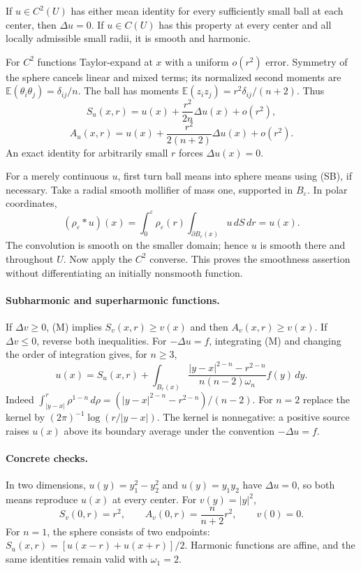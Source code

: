 \begin{theorem}
If $u\in C^2(U)$ has either mean identity for every sufficiently small
ball at each center, then $\Delta u=0$.
If $u\in C(U)$ has this property at every center and all locally admissible
small radii, it is smooth and harmonic.
\end{theorem}
\begin{expandedproof}
For $C^2$ functions Taylor-expand at $x$ with a uniform $o(r^2)$ error.
Symmetry of the sphere cancels linear and mixed terms; its normalized
second moments are
$\mathbb E(\theta_i\theta_j)=\delta_{ij}/n$.
The ball has moments $\mathbb E(z_i z_j)=r^2\delta_{ij}/(n+2)$.
Thus
\[
 S_u(x,r)=u(x)+\frac{r^2}{2n}\Delta u(x)+o(r^2),
\]
\[
 A_u(x,r)=u(x)+\frac{r^2}{2(n+2)}\Delta u(x)+o(r^2).
 \tag{T}
\]
An exact identity for arbitrarily small $r$ forces $\Delta u(x)=0$.

For a merely continuous $u$, first turn ball means into sphere means
using (SB), if necessary. Take a radial smooth mollifier of mass one,
supported in $B_\varepsilon$. In polar coordinates,
\[
 (\rho_\varepsilon*u)(x)
 =\int_0^\varepsilon \rho_\varepsilon(r)
       \int_{\partial B_r(x)}u\,dS\,dr=u(x).
\]
The convolution is smooth on the smaller domain; hence $u$ is smooth
there and throughout $U$. Now apply the $C^2$ converse.
This proves the smoothness assertion without differentiating an
initially nonsmooth function.
\end{expandedproof}
\Needspace{45mm}

\paragraph{Subharmonic and superharmonic functions.}
If $\Delta v\geq0$, (M) implies $S_v(x,r)\geq v(x)$ and then
$A_v(x,r)\geq v(x)$. If $\Delta v\leq0$, reverse both inequalities.
For $-\Delta u=f$, integrating (M) and changing the order of integration
gives, for $n\geq3$,
\[
 u(x)=S_u(x,r)+\int_{B_r(x)}
 \frac{|y-x|^{2-n}-r^{2-n}}{n(n-2)\omega_n}f(y)\,dy.
 \tag{P}
\]
Indeed $\int_{|y-x|}^r\rho^{1-n}\,d\rho
=(|y-x|^{2-n}-r^{2-n})/(n-2)$.
For $n=2$ replace the kernel by $(2\pi)^{-1}\log(r/|y-x|)$.
The kernel is nonnegative: a positive source raises $u(x)$ above
its boundary average under the convention $-\Delta u=f$.

\paragraph{Concrete checks.}
In two dimensions, $u(y)=y_1^2-y_2^2$ and $u(y)=y_1y_2$ have
$\Delta u=0$, so both means reproduce $u(x)$ at every center.
For $v(y)=|y|^2$,
\[
 S_v(0,r)=r^2,\qquad A_v(0,r)=\frac n{n+2}r^2,\qquad v(0)=0.
\]
For $n=1$, the sphere consists of two endpoints:
$S_u(x,r)=[u(x-r)+u(x+r)]/2$. Harmonic functions are affine,
and the same identities remain valid with $\omega_1=2$.
\Needspace{45mm}
